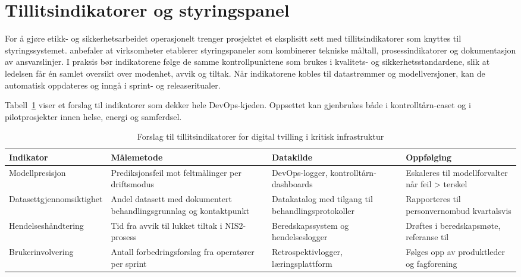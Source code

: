 \section{Tillitsindikatorer og styringspanel}
For å gjøre etikk- og sikkerhetsarbeidet operasjonelt trenger prosjektet et eksplisitt sett med tillitsindikatorer som knyttes til styringssystemet. \citet{digdir2023styringai} anbefaler at virksomheter etablerer styringspaneler som kombinerer tekniske måltall, prosessindikatorer og dokumentasjon av ansvarslinjer. I praksis bør indikatorene følge de samme kontrollpunktene som brukes i kvalitets- og sikkerhetsstandardene, slik at ledelsen får én samlet oversikt over modenhet, avvik og tiltak. Når indikatorene kobles til datastrømmer og modellversjoner, kan de automatisk oppdateres og inngå i sprint- og releaseritualer.

Tabell~\ref{tab:tillitsindikatorer} viser et forslag til indikatorer som dekker hele DevOps-kjeden. Oppsettet kan gjenbrukes både i kontrolltårn-caset og i pilotprosjekter innen helse, energi og samferdsel.

\begin{table}[ht]
    \centering
    \caption{Forslag til tillitsindikatorer for digital tvilling i kritisk infrastruktur}
    \label{tab:tillitsindikatorer}
    \begin{tabular}{|p{3.2cm}|p{4.2cm}|p{4.2cm}|p{3.2cm}|}
        \hline
        \textbf{Indikator} & \textbf{Målemetode} & \textbf{Datakilde} & \textbf{Oppfølging} \\
        \hline
        Modellpresisjon & Prediksjonsfeil mot feltmålinger per driftsmodus & DevOps-logger, kontrolltårn-dashboards & Eskaleres til modellforvalter når feil > terskel \citep{dnv2023digitalassurance} \\
        \hline
        Datasettgjennomsiktighet & Andel datasett med dokumentert behandlingsgrunnlag og kontaktpunkt & Datakatalog med tilgang til behandlingsprotokoller & Rapporteres til personvernombud kvartalsvis \\
        \hline
        Hendelseshåndtering & Tid fra avvik til lukket tiltak i NIS2-prosess & Beredskapssystem og hendelseslogger & Drøftes i beredskapsmøte, referanse til \citet{eu2022nis2} \\
        \hline
        Brukerinvolvering & Antall forbedringsforslag fra operatører per sprint & Retrospektivlogger, læringsplattform & Følges opp av produktleder og fagforening \\
        \hline
    \end{tabular}
\end{table}

